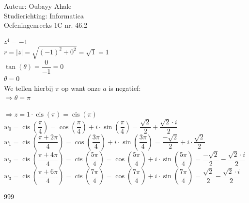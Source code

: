 \documentclass[a4paper]{article}
\begin{document}
  
\noindent \large Auteur: Oubayy Ahale          \\
\noindent \large Studierichting: Informatica   \\
\noindent \large Oefeningenreeks 1C nr. 46.2   \\

\medskip

\normalsize

$ z^4 = -1 $\\

$ r = |z| = \sqrt{(-1)^2 + 0^2} = \sqrt{1} = 1 $\\

$ \tan(\theta) = \dfrac{0}{-1} = 0             $\\

$ \theta = 0 $\\

We tellen hierbij $\pi$ op want onze $a$ is negatief: \\

$ \Rightarrow \theta = \pi $\\

\medskip

$ \Rightarrow z = 1 \cdot \operatorname{cis}(\pi) =  \operatorname{cis}(\pi) $\\

$w_0 =  \operatorname{cis}\left(\dfrac{\pi}{4}\right) = \cos\left(\dfrac{\pi}{4}\right) + i \cdot \sin\left(\dfrac{\pi}{4}\right) = \dfrac{\sqrt{2}}{2} + \dfrac{\sqrt{2} \cdot i}{2} $\\

$w_1 =  \operatorname{cis}\left( \dfrac{\pi + 2\pi}{4} \right) = \cos\left(\dfrac{3\pi}{4}\right) + i \cdot \sin\left(\dfrac{3\pi}{4}\right) = \dfrac{-\sqrt{2}}{2} + i \cdot \dfrac{\sqrt{2}}{2} $\\

$w_2 =  \operatorname{cis}\left(\dfrac{\pi + 4\pi}{4}\right) =  \operatorname{cis}\left(\dfrac{5\pi}{4}\right) = \cos\left(\dfrac{5\pi}{4}\right) + i \cdot \sin\left(\dfrac{5\pi}{4}\right) = \dfrac{-\sqrt{2}}{2} - \dfrac{\sqrt{2} \cdot i}{2} $\\

$w_3 =  \operatorname{cis}\left(\dfrac{\pi + 6\pi}{4}\right) = \operatorname{cis}\left(\dfrac{7\pi}{4}\right) = \cos\left(\dfrac{7\pi}{4}\right) + i \cdot \sin\left(\dfrac{7\pi}{4}\right) = \dfrac{\sqrt{2}}{2} - \dfrac{\sqrt{2} \cdot i}{2} $\\

\begin{thebibliography}{999}
\end{thebibliography}
\end{document}
